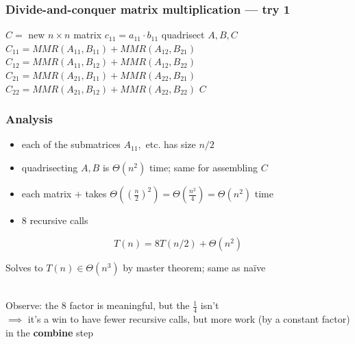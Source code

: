\documentclass{beamer}
\newcommand{\stanza}{ \\~\ }
\begin{document}
\begin{frame} \frametitle{Divide-and-conquer matrix multiplication --- try 1}
  {
  \begin{algorithmic}[1]
    \State $C = $ new $n \times n$ matrix
      \State $c_{11} = a_{11} \cdot b_{11}$
    \Else
      \State quadrisect $A, B, C$
      \State $C_{11} = MMR(A_{11}, B_{11}) + MMR(A_{12}, B_{21})$
      \State $C_{12} = MMR(A_{11}, B_{12}) + MMR(A_{12}, B_{22})$
      \State $C_{21} = MMR(A_{21}, B_{11}) + MMR(A_{22}, B_{21})$
      \State $C_{22} = MMR(A_{21}, B_{12}) + MMR(A_{22}, B_{22})$
    \EndIf
    \State \Return $C$
    \EndFunction
  \end{algorithmic}
  }
\end{frame}

\begin{frame} \frametitle{Analysis}
\begin{itemize}
  \item each of the submatrices $A_{11},$ etc. has size $n/2$
  \item quadrisecting $A, B$ is $\Theta(n^2)$ time; same for assembling $C$
  \item each matrix $+$ takes $\Theta( (\frac{n}{2})^2 ) = \Theta(\frac{n^2}{4}) = \Theta(n^2)$ time
  \item 8 recursive calls
\end{itemize}
\[ T(n) = 8 T(n/2) + \Theta(n^2) \]

Solves to $T(n) \in \Theta(n^3)$ by master theorem; same as na\"ive \stanza

Observe: the 8 factor is meaningful, but the $\frac{1}{4}$ isn't \\
$\implies$ it's a win to have fewer recursive calls, but more work (by a
constant factor) in the \textbf{combine} step
\end{frame}
\end{document}

